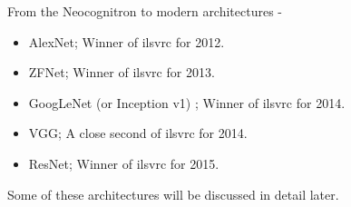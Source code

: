 \begin{frame}[t,allowframebreaks]{From the Neocognitron to modern architectures -}
\begin{itemize}
        \item 
        \gls{AlexNet}\cite{Krizhevsky:2012alexnet};
        Winner of \gls{ilsvrc} for 2012.
    
        \item 
        \gls{ZFNet}\cite{Zaremba:2016zfnet};
        Winner of \gls{ilsvrc} for 2013.
    
        \item 
        \gls{GoogLeNet} 
        (or \gls{Inception} v1)
        \cite{Szegedy:2014gnet};
        Winner of \gls{ilsvrc} for 2014.
    
        \item 
        \gls{VGG}\cite{Simonyan:2015vgg};
        A close second of \gls{ilsvrc} for 2014.
    
        \item 
        \gls{ResNet}\cite{He:2016resnet};
        Winner of \gls{ilsvrc} for 2015.    
    \end{itemize}

    \vspace{0.2cm}
    Some of these architectures will be discussed in detail later.
    
    \end{frame}
    